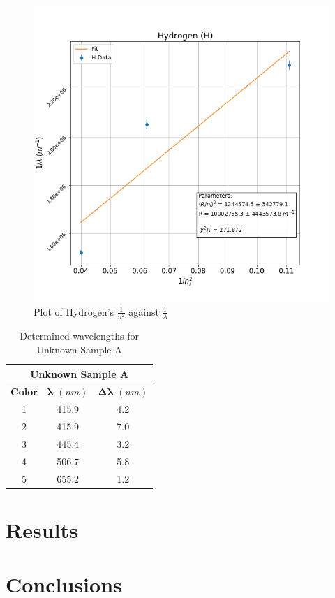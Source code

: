\documentclass[a4paper, twocolumn]{article}
\begin{document}
\begin{figure}[h!]
 \centering
 \includegraphics[scale = 0.4]{hydrogen}
 \caption{Plot of Hydrogen's $\frac{1}{n^2}$ against $\frac{1}{\lambda}$}
 \label{fig:hydrogen}
\end{figure}

\begin{table}[h!]
\centering
\begin{tabular}{ |c||c|c| }
 \hline
 \multicolumn{3}{|c|}{\textbf{Unknown Sample A}} \\
 \hline
 \textbf{Color} & $\boldsymbol{\lambda}$ $(nm)$ & $\boldsymbol{\Delta\lambda}$ $(nm)$ \\
 \hline
 1 & 415.9 & 4.2 \\
 \hline
 2 & 415.9 & 7.0 \\
 \hline
 3 & 445.4 & 3.2 \\
 \hline
 4 & 506.7 & 5.8 \\
 \hline
 5 & 655.2 & 1.2 \\
 \hline
\end{tabular}
\caption{Determined wavelengths for Unknown Sample A}
\label{table:lambdaA}
\end{table}

\section{Results}


\section{Conclusions}
\end{document}

